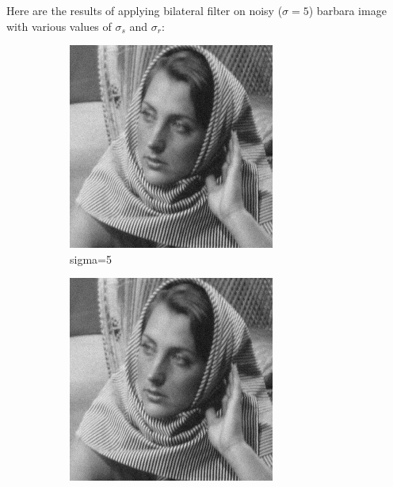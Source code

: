 \documentclass[12pt]{article}
\begin{document}
Here are the results of applying bilateral filter on noisy ($\sigma = 5$) barbara image with various values of $\sigma_s$ and $\sigma_r$:

\begin{figure}[h]
    \centering
    \begin{subfigure}[b]{0.24\textwidth}
        \centering
        \includegraphics[width=\textwidth]{../images/noisy_barbara256.png}
        \caption{sigma=5}
        \label{Noisy }
    \end{subfigure}
    \begin{subfigure}[b]{0.24\textwidth}
        \centering
        \includegraphics[width=\textwidth]{../images/filtered_barbara256_bilateral_sigma_s_2_sigma_r_2.png}

\end{subfigure}
\end{figure}
\end{document}
